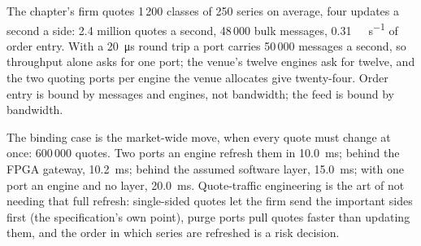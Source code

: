 \begin{omfigure}

\label{fig:nw:equities-and-options-connectivity:refresh}
\end{omfigure}

The chapter's firm quotes 1\,200 classes of 250 series on average, four updates a second a side: 2.4 million quotes a second,
48\,000 bulk messages, \qty{0.31}{\giga\bit\per\second} of order entry. With a \qty{20}{\micro\second} round trip a port carries
50\,000 messages a second, so throughput alone asks for one port; the venue's twelve engines ask for twelve, and the two quoting
ports per engine the venue allocates give twenty-four. Order entry is bound by messages and engines, not bandwidth; the feed is
bound by bandwidth.

The binding case is the market-wide move, when every quote must change at once: 600\,000 quotes. Two ports an engine refresh them
in \qty{10.0}{\milli\second}; behind the FPGA gateway, \qty{10.2}{\milli\second}; behind the assumed software layer,
\qty{15.0}{\milli\second}; with one port an engine and no layer, \qty{20.0}{\milli\second}. Quote-traffic engineering is the
art of not needing that full refresh: single-sided quotes let the firm send the important sides first (the specification's own
point), purge ports pull quotes faster than updating them, and the order in which series are refreshed is a risk decision.

